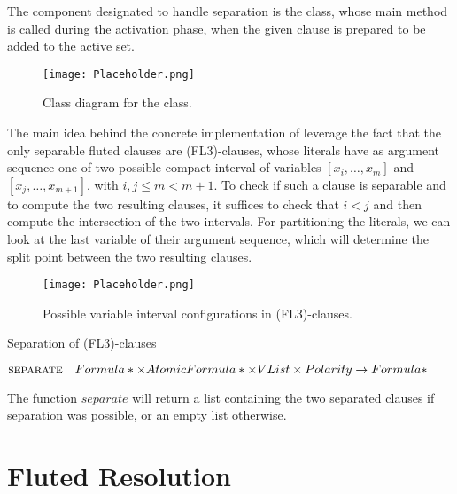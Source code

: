 The component designated to handle separation is the  class, whose main method  is called during the activation phase, when the given clause is prepared to be added to the active set.

\begin{figure}[H]
  \centering
  \texttt{[image: Placeholder.png]}
  \caption{Class diagram for the  class.}\label{fig:separator-class-diagram}
\end{figure}

The main idea behind the concrete implementation of  leverage the fact that the only separable fluted clauses are (FL3)-clauses, whose literals have as argument sequence one of two possible compact interval of variables \([x_i,\ldots,x_m]\) and \([x_j,\ldots,x_{m+1}]\), with \(i,j \leq m < m+1\).
To check if such a clause is separable and to compute the two resulting clauses, it suffices to check that \(i < j\) and then compute the intersection of the two intervals. For partitioning the literals, we can look at the last variable of their argument sequence, which will determine the split point between the two resulting clauses.

\begin{figure}
  \centering
  \texttt{[image: Placeholder.png]}
  \caption{Possible variable interval configurations in (FL3)-clauses.}\label{fig:separator-sequence-diagram}
\end{figure}

\begin{algorithm}
  \caption{Separation of (FL3)-clauses}\label{alg:separation}
  \begin{algorithmic}[1]
    \Statex{}  \(\textsc{separate}\quad Formula*\times AtomicFormula*\times VList\times Polarity\to Formula*\)
      \EndFunction
  \end{algorithmic}
\end{algorithm}

The function \(separate\) will return a list containing the two separated clauses if separation was possible, or an empty list otherwise.

\section{Fluted Resolution}\label{sec:fluted-resolution-impl}




